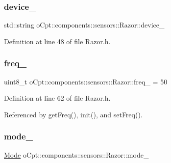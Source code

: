 \subsubsection{\texorpdfstring{device\+\_\+}{device\_}}
{\footnotesize\ttfamily std\+::string o\+Cpt\+::components\+::sensors\+::\+Razor\+::device\+\_\+\hspace{0.3cm}{\ttfamily [private]}}



Definition at line 48 of file Razor.\+h.

\hypertarget{classo_cpt_1_1components_1_1sensors_1_1_razor_a7b71014d6a35c9b9f24b636bd3f6471c}{}\label{classo_cpt_1_1components_1_1sensors_1_1_razor_a7b71014d6a35c9b9f24b636bd3f6471c} 
\subsubsection{\texorpdfstring{freq\+\_\+}{freq\_}}
{\footnotesize\ttfamily uint8\+\_\+t o\+Cpt\+::components\+::sensors\+::\+Razor\+::freq\+\_\+ = 50\hspace{0.3cm}{\ttfamily [private]}}



Definition at line 62 of file Razor.\+h.



Referenced by get\+Freq(), init(), and set\+Freq().

\hypertarget{classo_cpt_1_1components_1_1sensors_1_1_razor_aa6610c4127d6fa300a5e2b5fa3eca461}{}\label{classo_cpt_1_1components_1_1sensors_1_1_razor_aa6610c4127d6fa300a5e2b5fa3eca461} 
\subsubsection{\texorpdfstring{mode\+\_\+}{mode\_}}
{\footnotesize\ttfamily \hyperlink{classo_cpt_1_1components_1_1sensors_1_1_razor_afed258e485aaaf9193a57d649ccb159b}{Mode} o\+Cpt\+::components\+::sensors\+::\+Razor\+::mode\+\_\+\hspace{0.3cm}{\ttfamily [private]}}



